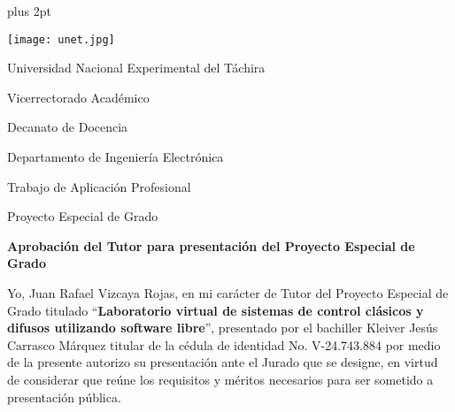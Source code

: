 % 

\begin{titlepage}
    \parskip=7.25pt plus 2pt
    \setcounter{page}{3}
    \begin{center}
        \begin{spacing}{1}
        \texttt{[image: unet.jpg]}
        
        Universidad Nacional Experimental del Táchira 
        
        Vicerrectorado Académico
        
        Decanato de Docencia
        
        Departamento de Ingeniería Electrónica
        
        Trabajo de Aplicación Profesional
        
        Proyecto Especial de Grado
        \end{spacing}
    \end{center}
    
    \vspace{0.5cm}
    
    \begin{center}
            
            \textbf{Aprobación del Tutor para presentación del Proyecto Especial de Grado}
            
    \end{center}
    
    \vspace{0.5cm}
    
    \begin{spacing}{1.5}
        Yo, Juan Rafael Vizcaya Rojas, en mi carácter de Tutor del Proyecto Especial de Grado titulado \enquote{\textbf{Laboratorio virtual de sistemas de control clásicos y difusos utilizando software libre}}, presentado por el bachiller Kleiver Jesús Carrasco Márquez titular de la cédula de identidad No. \mbox{V-24.743.884} por medio de la presente autorizo su presentación ante el Jurado que se designe, en virtud de considerar que reúne los requisitos y méritos necesarios para ser sometido a presentación pública.
    \end{spacing}
    

\end{titlepage}
